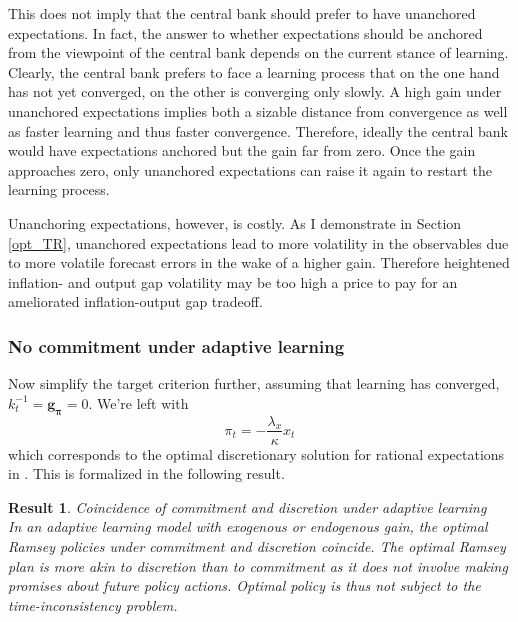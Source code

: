 \documentclass[11pt]{article}
\renewcommand{\[}{\begin{equation}}
\renewcommand{\]}{\end{equation}}
\newtheorem{result}{Result}
\begin{document}
This does not imply that the central bank should prefer to have unanchored expectations. In fact, the answer to whether expectations should be anchored from the viewpoint of the central bank depends on the current stance of learning.   Clearly, the central bank prefers to face a learning process that on the one hand has not yet converged, on the other is converging only slowly. A high gain under unanchored expectations implies both a sizable distance from convergence as well as faster learning and thus faster convergence. Therefore, ideally the central bank would have expectations anchored but the gain far from zero. Once the gain approaches zero, only unanchored expectations can raise it again to restart the learning process.

Unanchoring expectations, however, is costly. As I demonstrate in Section \ref{opt_TR}, unanchored expectations lead to more volatility in the observables due to more volatile forecast errors in the wake of a higher gain. Therefore heightened inflation- and output gap volatility may be too high a price to pay for an ameliorated inflation-output gap tradeoff.

\subsubsection{No commitment under adaptive learning}
Now simplify the target criterion further, assuming that learning has converged, $k_t^{-1} = \mathbf{g_\pi} = 0$. We're left with 
\begin{equation}
\pi_t  = -\frac{\lambda_x}{\kappa}x_t \label{cgg_discretion}
\end{equation}
which corresponds to the optimal discretionary solution for rational expectations in \cite{clarida1999science}. This is formalized in the following result.

\begin{result} Coincidence of commitment and discretion under adaptive learning \\
In an adaptive learning model with exogenous or endogenous gain, the optimal Ramsey policies under commitment and discretion coincide. The optimal Ramsey plan is more akin to discretion than to commitment as it does not involve making promises about future policy actions. Optimal policy is thus not subject to the time-inconsistency problem.
\label{result_no_commitment}
\end{result}
\end{document}
